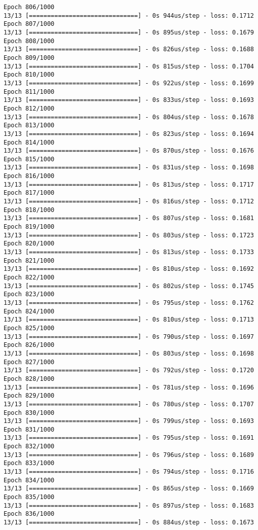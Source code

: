 \documentclass[11pt]{article}
\begin{document}
\begin{Verbatim}[commandchars=\\\{\}]
Epoch 806/1000
13/13 [==============================] - 0s 944us/step - loss: 0.1712
Epoch 807/1000
13/13 [==============================] - 0s 895us/step - loss: 0.1679
Epoch 808/1000
13/13 [==============================] - 0s 826us/step - loss: 0.1688
Epoch 809/1000
13/13 [==============================] - 0s 815us/step - loss: 0.1704
Epoch 810/1000
13/13 [==============================] - 0s 922us/step - loss: 0.1699
Epoch 811/1000
13/13 [==============================] - 0s 833us/step - loss: 0.1693
Epoch 812/1000
13/13 [==============================] - 0s 804us/step - loss: 0.1678
Epoch 813/1000
13/13 [==============================] - 0s 823us/step - loss: 0.1694
Epoch 814/1000
13/13 [==============================] - 0s 870us/step - loss: 0.1676
Epoch 815/1000
13/13 [==============================] - 0s 831us/step - loss: 0.1698
Epoch 816/1000
13/13 [==============================] - 0s 813us/step - loss: 0.1717
Epoch 817/1000
13/13 [==============================] - 0s 816us/step - loss: 0.1712
Epoch 818/1000
13/13 [==============================] - 0s 807us/step - loss: 0.1681
Epoch 819/1000
13/13 [==============================] - 0s 803us/step - loss: 0.1723
Epoch 820/1000
13/13 [==============================] - 0s 813us/step - loss: 0.1733
Epoch 821/1000
13/13 [==============================] - 0s 810us/step - loss: 0.1692
Epoch 822/1000
13/13 [==============================] - 0s 802us/step - loss: 0.1745
Epoch 823/1000
13/13 [==============================] - 0s 795us/step - loss: 0.1762
Epoch 824/1000
13/13 [==============================] - 0s 810us/step - loss: 0.1713
Epoch 825/1000
13/13 [==============================] - 0s 790us/step - loss: 0.1697
Epoch 826/1000
13/13 [==============================] - 0s 803us/step - loss: 0.1698
Epoch 827/1000
13/13 [==============================] - 0s 792us/step - loss: 0.1720
Epoch 828/1000
13/13 [==============================] - 0s 781us/step - loss: 0.1696
Epoch 829/1000
13/13 [==============================] - 0s 780us/step - loss: 0.1707
Epoch 830/1000
13/13 [==============================] - 0s 799us/step - loss: 0.1693
Epoch 831/1000
13/13 [==============================] - 0s 795us/step - loss: 0.1691
Epoch 832/1000
13/13 [==============================] - 0s 796us/step - loss: 0.1689
Epoch 833/1000
13/13 [==============================] - 0s 794us/step - loss: 0.1716
Epoch 834/1000
13/13 [==============================] - 0s 865us/step - loss: 0.1669
Epoch 835/1000
13/13 [==============================] - 0s 897us/step - loss: 0.1683
Epoch 836/1000
13/13 [==============================] - 0s 884us/step - loss: 0.1673

\end{Verbatim}
\end{document}
